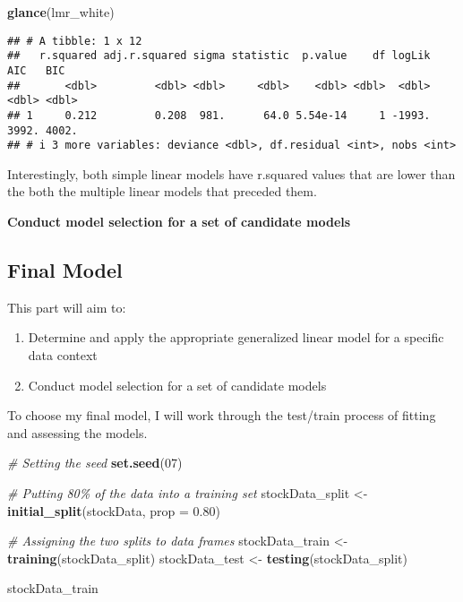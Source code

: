 \documentclass[
]{article}
\newenvironment{Shaded}{\begin{snugshade}}{\end{snugshade}}
\newcommand{\AttributeTok}[1]{\textcolor[rgb]{0.13,0.29,0.53}{#1}}
\newcommand{\CommentTok}[1]{\textcolor[rgb]{0.56,0.35,0.01}{\textit{#1}}}
\newcommand{\DecValTok}[1]{\textcolor[rgb]{0.00,0.00,0.81}{#1}}
\newcommand{\FloatTok}[1]{\textcolor[rgb]{0.00,0.00,0.81}{#1}}
\newcommand{\FunctionTok}[1]{\textcolor[rgb]{0.13,0.29,0.53}{\textbf{#1}}}
\newcommand{\NormalTok}[1]{#1}
\newcommand{\OtherTok}[1]{\textcolor[rgb]{0.56,0.35,0.01}{#1}}
\providecommand{\tightlist}{%
  \setlength{\itemsep}{0pt}\setlength{\parskip}{0pt}}
\begin{document}
\begin{Shaded}
\begin{Highlighting}[]
\FunctionTok{glance}\NormalTok{(lmr\_white)}
\end{Highlighting}
\end{Shaded}

\begin{verbatim}
## # A tibble: 1 x 12
##   r.squared adj.r.squared sigma statistic  p.value    df logLik   AIC   BIC
##       <dbl>         <dbl> <dbl>     <dbl>    <dbl> <dbl>  <dbl> <dbl> <dbl>
## 1     0.212         0.208  981.      64.0 5.54e-14     1 -1993. 3992. 4002.
## # i 3 more variables: deviance <dbl>, df.residual <int>, nobs <int>
\end{verbatim}

Interestingly, both simple linear models have r.squared values that are
lower than the both the multiple linear models that preceded them.

\textbf{Conduct model selection for a set of candidate models}

\hypertarget{final-model}{%
\subsection{Final Model}\label{final-model}}

This part will aim to:

\begin{enumerate}
\def\labelenumi{\arabic{enumi}.}
\tightlist
\item
  Determine and apply the appropriate generalized linear model for a
  specific data context
\item
  Conduct model selection for a set of candidate models
\end{enumerate}

To choose my final model, I will work through the test/train process of
fitting and assessing the models.

\begin{Shaded}
\begin{Highlighting}[]
\CommentTok{\# Setting the seed}
\FunctionTok{set.seed}\NormalTok{(}\DecValTok{07}\NormalTok{)}

\CommentTok{\# Putting 80\% of the data into a training set}
\NormalTok{stockData\_split }\OtherTok{\textless{}{-}} \FunctionTok{initial\_split}\NormalTok{(stockData, }\AttributeTok{prop =} \FloatTok{0.80}\NormalTok{)}

\CommentTok{\# Assigning the two splits to data frames}
\NormalTok{stockData\_train }\OtherTok{\textless{}{-}} \FunctionTok{training}\NormalTok{(stockData\_split)}
\NormalTok{stockData\_test }\OtherTok{\textless{}{-}} \FunctionTok{testing}\NormalTok{(stockData\_split)}

\NormalTok{stockData\_train}
\end{Highlighting}
\end{Shaded}
\end{document}
